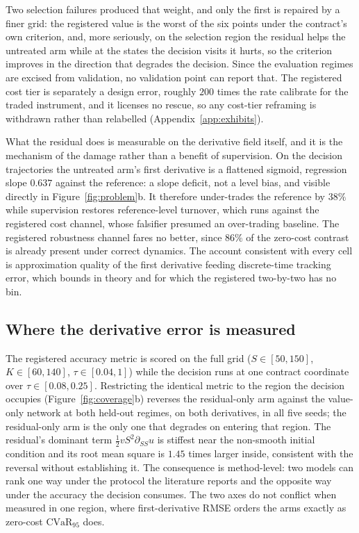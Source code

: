 \documentclass{article}
\begin{document}
Two selection failures produced that weight, and only the first is repaired by a
finer grid: the registered value is the worst of the six points under the contract's
own criterion, and, more seriously, on the selection region the residual helps the
untreated arm while at the states the decision visits it hurts, so the criterion
improves in the direction that degrades the decision. Since the evaluation regimes
are excised from validation, no validation point can report that. The registered
cost tier is separately a design error, roughly $200$ times the rate
\citet{armstrong2024deep} calibrate for the traded instrument, and it licenses no
rescue, so any cost-tier reframing is withdrawn rather than relabelled
(Appendix~\ref{app:exhibits}).

What the residual does is measurable on the derivative field itself, and it is the
mechanism of the damage rather than a benefit of supervision. On the decision
trajectories the untreated arm's first derivative is a flattened sigmoid, regression
slope $0.637$ against the reference: a slope deficit, not a level bias, and visible
directly in Figure~\ref{fig:problem}b. It therefore under-trades the reference by
$38\%$ while supervision restores reference-level turnover, which runs against the
registered cost channel, whose falsifier presumed an over-trading baseline. The
registered robustness channel fares no better, since $86\%$ of the zero-cost
contrast is already present under correct dynamics. The account consistent with
every cell is approximation quality of the first derivative feeding discrete-time
tracking error, which \citet{noguer2026derivative} bounds in theory and for which
the registered two-by-two has no bin.

\subsection{Where the derivative error is measured}
\label{sec:region}

The registered accuracy metric is scored on the full grid ($S \in [50,150]$,
$K \in [60,140]$, $\tau \in [0.04,1]$) while the decision runs at one contract
coordinate over $\tau \in [0.08, 0.25]$. Restricting the identical metric to the
region the decision occupies (Figure~\ref{fig:coverage}b) reverses the residual-only
arm against the value-only network at both held-out regimes, on both derivatives,
in all five seeds; the residual-only arm is the only one that degrades on entering
that region. The residual's dominant term $\tfrac12 vS^{2}\partial_{SS}u$ is
stiffest near the non-smooth initial condition and its root mean square is $1.45$
times larger inside, consistent with the reversal without establishing it. The
consequence is method-level: two models can rank one way under the protocol the
literature reports and the opposite way under the accuracy the decision consumes.
The two axes do not conflict when measured in one region, where first-derivative
RMSE orders the arms exactly as zero-cost $\mathrm{CVaR}_{95}$ does.
\end{document}
